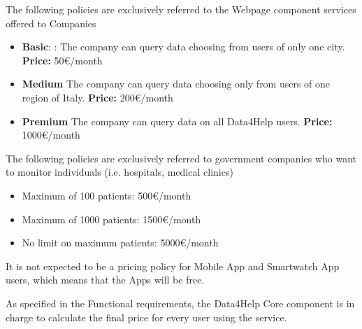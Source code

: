 The following policies are exclusively referred to the Webpage component services offered to Companies

\begin{itemize}
    \item	\textbf{Basic}: : The company can query data choosing from users of only one city.
\textbf{Price:} 50\euro/month
    \item \textbf{Medium} The company can query data choosing only from users of one region of Italy.
\textbf{Price:} 200\euro/month
    \item \textbf{Premium} The company can query data on all Data4Help users.
\textbf{Price:} 1000\euro/month
\end{itemize}

\noindent The following policies are exclusively referred to government companies who want to monitor individuals (i.e. hospitals, medical clinics) 

\begin{itemize}
    \item Maximum of 100 patients:
500\euro/month
    \item Maximum of 1000 patients: 
1500\euro/month
    \item No limit on maximum patients:
5000\euro/month
\end{itemize}




\noindent It is not expected to be a pricing policy for Mobile App and Smartwatch App users, which means that the Apps will be free.

\noindent As specified in the Functional requirements, the Data4Help Core component is in charge to calculate the final price for every user using the service.







